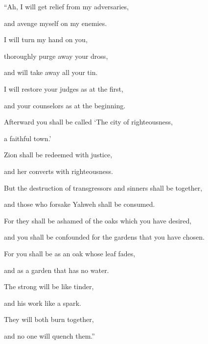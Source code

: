 {\par }{\Q “Ah, I will get relief from my adversaries,
\par }{\QB and avenge myself on my enemies.
\par }{\Q {}I will turn my hand on you,
\par }{\QB thoroughly purge away your dross,
\par }{\QB and will take away all your tin.
\par }{\Q {}I will restore your judges as at the first,
\par }{\QB and your counselors as at the beginning.
\par }{\Q Afterward you shall be called ‘The city of righteousness,
\par }{\QB a faithful town.’
\par }{\Q {}Zion shall be redeemed with justice,
\par }{\QB and her converts with righteousness.
\par }{\Q {}But the destruction of transgressors and sinners shall be together,
\par }{\QB and those who forsake Yahweh shall be consumed.
\par }{\Q {}For they shall be ashamed of the oaks which you have desired,
\par }{\QB and you shall be confounded for the gardens that you have chosen.
\par }{\Q {}For you shall be as an oak whose leaf fades,
\par }{\QB and as a garden that has no water.
\par }{\Q {}The strong will be like tinder,
\par }{\QB and his work like a spark.
\par }{\Q They will both burn together,
\par }{\QB and no one will quench them.”

}
